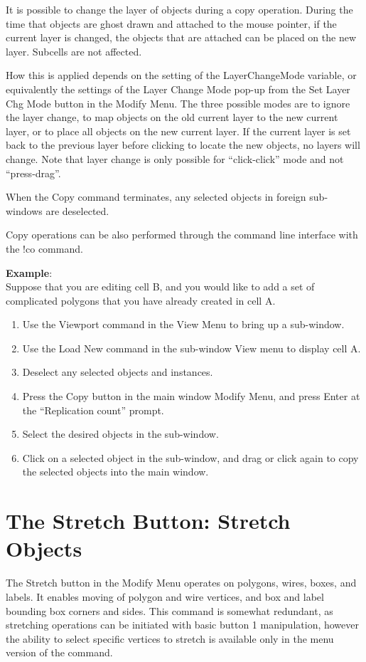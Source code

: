 It is possible to change the layer of objects during a copy operation. 
During the time that objects are ghost drawn and attached to the mouse
pointer, if the current layer is changed, the objects that are
attached can be placed on the new layer.  Subcells are not affected. 

How this is applied depends on the setting of the {\et
LayerChangeMode} variable, or equivalently the settings of the {\cb
Layer Change Mode} pop-up from the {\cb Set Layer Chg Mode} button
in the {\cb Modify Menu}.  The three possible modes are to ignore the
layer change, to map objects on the old current layer to the new
current layer, or to place all objects on the new current layer.  If
the current layer is set back to the previous layer before clicking to
locate the new objects, no layers will change.  Note that layer change
is only possible for ``click-click'' mode and not ``press-drag''.

When the {\cb Copy} command terminates, any selected objects in
foreign sub-windows are deselected.

Copy operations can be also performed through the command line
interface with the {\cb !co} command.

{\bf Example}:\\
Suppose that you are editing cell B, and you would like to add a     
set of complicated polygons that you have already created in cell A.

\begin{enumerate}
\item{Use the {\cb Viewport} command in the {\cb View Menu} to bring up
a sub-window.}
\item{Use the {\cb Load New} command in the sub-window {\cb View} menu
to display cell A.}
\item{Deselect any selected objects and instances.}
\item{Press the {\cb Copy} button in the main window {\cb Modify Menu},
and press {\kb Enter} at the ``Replication count'' prompt.}
\item{Select the desired objects in the sub-window.}
\item{Click on a selected object in the sub-window, and drag or click
again to copy the selected objects into the main window.}
\end{enumerate}

\section{The {\cb Stretch} Button: Stretch Objects}
The {\cb Stretch} button in the {\cb Modify Menu} operates on
polygons, wires, boxes, and labels.  It enables moving of polygon and
wire vertices, and box and label bounding box corners and sides.  This
command is somewhat redundant, as stretching operations can be
initiated with basic button 1 manipulation, however the ability to
select specific vertices to stretch is available only in the menu
version of the command.

